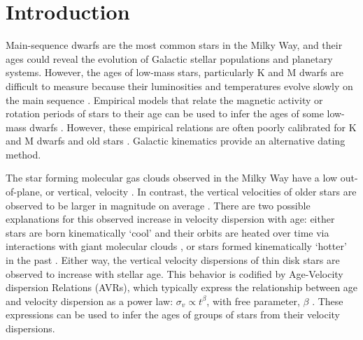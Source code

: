 \section{Introduction}

Main-sequence dwarfs are the most common stars in the Milky Way, and their
ages could reveal the evolution of Galactic stellar populations and planetary
systems.
However, the ages of low-mass stars, particularly K and M dwarfs are difficult
to measure because their luminosities and temperatures evolve slowly on the
main sequence \citep[see][for a review of stellar ages]{soderblom2010}.
Empirical models that relate the magnetic activity or rotation periods of
stars to their age can be used to infer the ages of some low-mass dwarfs
\citep{citations}.
However, these empirical relations are often poorly calibrated for K and M
dwarfs and old stars \citep{citations}.
Galactic kinematics provide an alternative dating method.

The star forming molecular gas clouds observed in the Milky Way have a low
out-of-plane, or vertical, velocity \citep[\eg][]{stark1989, stark2005,
aumer2009, martig2014, aumer2016}.
In contrast, the vertical velocities of older stars are observed to be larger
in magnitude on average \citep{stromberg1946, wielen1977, nordstrom2004,
holmberg2007, holmberg2009, aumer2009, casagrande2011, ting2019, yu2018}.
There are two possible explanations for this observed increase in velocity
dispersion with age: either stars are born kinematically `cool' and their
orbits are heated over time via interactions with giant molecular clouds
\citep[see][for a review of secular evolution in the MW]{sellwood2014}, or
stars formed kinematically `hotter' in the past \citep[\eg][]{bird2013}.
Either way, the vertical velocity dispersions of thin disk stars are observed
to increase with stellar age.
This behavior is codified by Age-Velocity dispersion Relations (AVRs), which
typically express the relationship between age and velocity dispersion as a
power law: $\sigma_v \propto t^\beta$, with free parameter, $\beta$
\citep[\eg][]{holmberg2009, yu2018}.
These expressions can be used to infer the ages of groups of stars from their
velocity dispersions.

